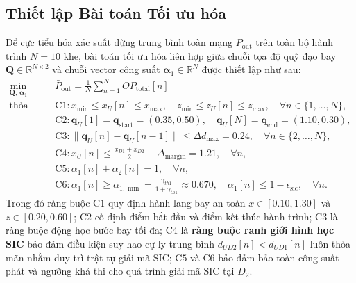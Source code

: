 \subsection*{Thiết lập Bài toán Tối ưu hóa}
Để cực tiểu hóa xác suất dừng trung bình toàn mạng $\bar{P}_{\text{out}}$ trên toàn bộ hành trình $N = 10$ khe, bài toán tối ưu hóa liên hợp giữa chuỗi tọa độ quỹ đạo bay $\mathbf{Q} \in \mathbb{R}^{N \times 2}$ và chuỗi vector công suất $\boldsymbol{\alpha}_1 \in \mathbb{R}^N$ được thiết lập như sau:
\begin{subequations}
\label{eq:opt_problem}
\begin{align}
    \min_{\mathbf{Q}, \, \boldsymbol{\alpha}_1} \quad & \bar{P}_{\text{out}} = \frac{1}{N} \sum_{n=1}^N OP_{\text{total}}[n] \label{eq:obj} \\
    \text{thỏa mãn} \quad 
    & \text{C1}: x_{\min} \le x_U[n] \le x_{\max}, \quad z_{\min} \le z_U[n] \le z_{\max}, \quad \forall n \in \{1, \dots, N\}, \label{eq:c1} \\
    & \text{C2}: \mathbf{q}_U[1] = \mathbf{q}_{\text{start}} = (0.35, 0.50), \quad \mathbf{q}_U[N] = \mathbf{q}_{\text{end}} = (1.10, 0.30), \label{eq:c2} \\
    & \text{C3}: \|\mathbf{q}_U[n] - \mathbf{q}_U[n-1]\| \le \Delta d_{\max} = 0.24, \quad \forall n \in \{2, \dots, N\}, \label{eq:c3} \\
    & \text{C4}: x_U[n] \le \frac{x_{D1} + x_{D2}}{2} - \Delta_{\text{margin}} = 1.21, \quad \forall n, \label{eq:c4} \\
    & \text{C5}: \alpha_1[n] + \alpha_2[n] = 1, \quad \forall n, \label{eq:c5} \\
    & \text{C6}: \alpha_1[n] \ge \alpha_{1,\min} = \frac{\gamma_{th1}}{1 + \gamma_{th1}} \approx 0.670, \quad \alpha_1[n] \le 1 - \epsilon_{\text{sic}}, \quad \forall n. \label{eq:c6}
\end{align}
\end{subequations}
Trong đó ràng buộc $\text{C1}$ quy định hành lang bay an toàn $x \in [0.10, 1.30]$ và $z \in [0.20, 0.60]$; $\text{C2}$ cố định điểm bắt đầu và điểm kết thúc hành trình; $\text{C3}$ là ràng buộc động học bước bay tối đa; $\text{C4}$ là \textbf{ràng buộc ranh giới hình học SIC} bảo đảm điều kiện suy hao cự ly trung bình $d_{UD2}[n] < d_{UD1}[n]$ luôn thỏa mãn nhằm duy trì trật tự giải mã SIC; $\text{C5}$ và $\text{C6}$ bảo đảm bảo toàn công suất phát và ngưỡng khả thi cho quá trình giải mã SIC tại $D_2$.


